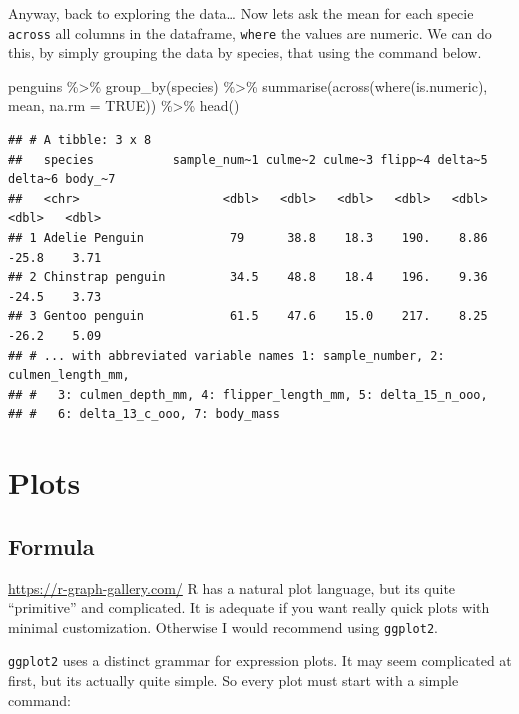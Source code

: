 \documentclass[
]{book}
\newenvironment{Shaded}{\begin{snugshade}}{\end{snugshade}}
\newcommand{\AttributeTok}[1]{\textcolor[rgb]{0.77,0.63,0.00}{#1}}
\newcommand{\ConstantTok}[1]{\textcolor[rgb]{0.00,0.00,0.00}{#1}}
\newcommand{\FunctionTok}[1]{\textcolor[rgb]{0.00,0.00,0.00}{#1}}
\newcommand{\NormalTok}[1]{#1}
\newcommand{\SpecialCharTok}[1]{\textcolor[rgb]{0.00,0.00,0.00}{#1}}
\begin{document}
Anyway, back to exploring the data\ldots{}
Now lets ask the mean for each specie \texttt{across} all columns in the dataframe, \texttt{where} the values are numeric.
We can do this, by simply grouping the data by species, that using the command below.

\begin{Shaded}
\begin{Highlighting}[]
\NormalTok{penguins }\SpecialCharTok{\%\textgreater{}\%} 
  \FunctionTok{group\_by}\NormalTok{(species) }\SpecialCharTok{\%\textgreater{}\%} 
  \FunctionTok{summarise}\NormalTok{(}\FunctionTok{across}\NormalTok{(}\FunctionTok{where}\NormalTok{(is.numeric), mean, }\AttributeTok{na.rm =} \ConstantTok{TRUE}\NormalTok{)) }\SpecialCharTok{\%\textgreater{}\%} 
  \FunctionTok{head}\NormalTok{()}
\end{Highlighting}
\end{Shaded}

\begin{verbatim}
## # A tibble: 3 x 8
##   species           sample_num~1 culme~2 culme~3 flipp~4 delta~5 delta~6 body_~7
##   <chr>                    <dbl>   <dbl>   <dbl>   <dbl>   <dbl>   <dbl>   <dbl>
## 1 Adelie Penguin            79      38.8    18.3    190.    8.86   -25.8    3.71
## 2 Chinstrap penguin         34.5    48.8    18.4    196.    9.36   -24.5    3.73
## 3 Gentoo penguin            61.5    47.6    15.0    217.    8.25   -26.2    5.09
## # ... with abbreviated variable names 1: sample_number, 2: culmen_length_mm,
## #   3: culmen_depth_mm, 4: flipper_length_mm, 5: delta_15_n_ooo,
## #   6: delta_13_c_ooo, 7: body_mass
\end{verbatim}

\hypertarget{plots}{%
\section{Plots}\label{plots}}

\hypertarget{formula}{%
\subsection{Formula}\label{formula}}

\url{https://r-graph-gallery.com/} R has a natural plot language, but its quite ``primitive'' and complicated.
It is adequate if you want really quick plots with minimal customization.
Otherwise I would recommend using \texttt{ggplot2}.

\texttt{ggplot2} uses a distinct grammar for expression plots.
It may seem complicated at first, but its actually quite simple.
So every plot must start with a simple command:
\end{document}
